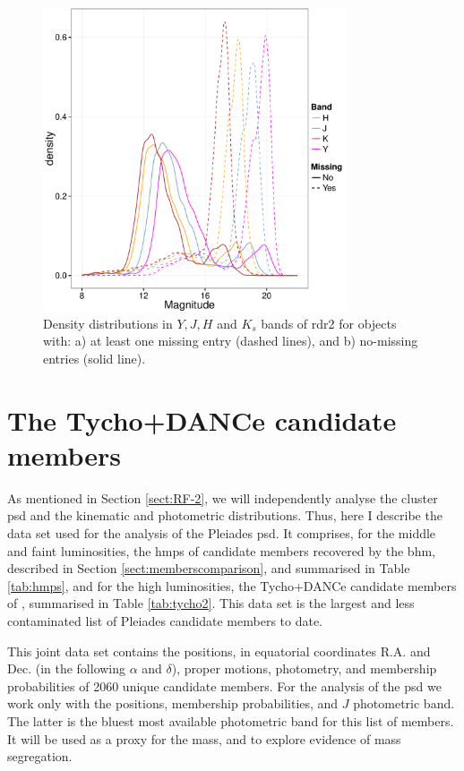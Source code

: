 \begin{figure}[ht!]
    \centering
      \includegraphics[page=1,width=0.8\textwidth]{background/Figures/ObservedDistributions.pdf}
\caption{Density distributions in $Y,J,H$ and $K_s$ bands of \gls{rdr2} for objects with: a) at least one missing entry (dashed lines), and b) no-missing entries (solid line).}
\label{fig:mis_vs_obs}
\end{figure}



\section{The Tycho+DANCe candidate members}
\label{sect:Tycho+DANCe}

As mentioned in Section \ref{sect:RF-2}, we will independently analyse the cluster \gls{psd} and the kinematic and photometric distributions.
Thus, here I describe the data set used for the analysis of the Pleiades \gls{psd}. It comprises, for the middle and faint luminosities, the \gls{hmps} of candidate members recovered by the \gls{bhm}, described in Section \ref{sect:memberscomparison}, and summarised in Table \ref{tab:hmps}, and for the high luminosities, the Tycho+DANCe candidate members of \cite{Bouy2015}, summarised in Table \ref{tab:tycho2}. This data set is the largest and less contaminated list of Pleiades candidate members to date. 

This joint data set contains the positions, in equatorial coordinates R.A. and Dec. (in the following $\alpha$ and $\delta$), proper motions, photometry, and membership probabilities of 2060 unique candidate members. For the analysis of the \gls{psd} we work only with the positions, membership probabilities, and $J$ photometric band. The latter is the bluest most available photometric band for this list of members. It will be used as a proxy for the mass, and to explore evidence of mass segregation.


